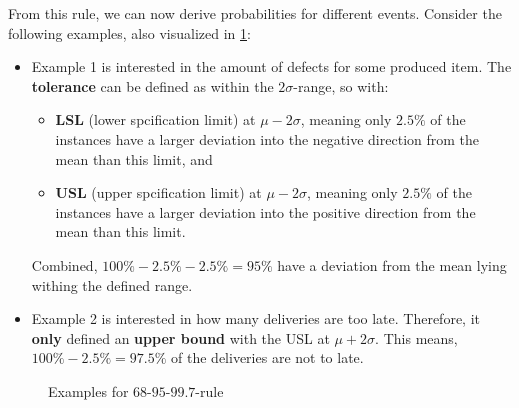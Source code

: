 From this rule, we can now derive probabilities for different events. Consider the following examples, also visualized in \ref{fig:2_three_sigma_examples}:
\begin{itemize}
  \item Example 1 is interested in the amount of defects for some produced item. The \textbf{tolerance} can be defined as within the $2\sigma$-range, so with:
  \begin{itemize}
    \item \textbf{LSL} (lower spcification limit) at $\mu-2\sigma$, meaning only $2.5\%$ of the instances have a larger deviation into the negative direction from the mean than this limit, and
    \item \textbf{USL} (upper spcification limit) at $\mu-2\sigma$, meaning only $2.5\%$ of the instances have a larger deviation into the positive direction from the mean than this limit.
  \end{itemize}
  Combined, $100\%-2.5\%-2.5\%=95\%$ have a deviation from the mean lying withing the defined range.
  \item Example 2 is interested in how many deliveries are too late. Therefore, it \textbf{only} defined an \textbf{upper bound} with the USL at $\mu+2\sigma$. This means, $100\%-2.5\%=97.5\%$ of the deliveries are not to late.
\end{itemize}

\begin{figure}[H]
  \centering
  \hspace*{0.05\textwidth}
  \caption{Examples for $68$-$95$-$99.7$-rule}
  \label{fig:2_three_sigma_examples}
\end{figure}

